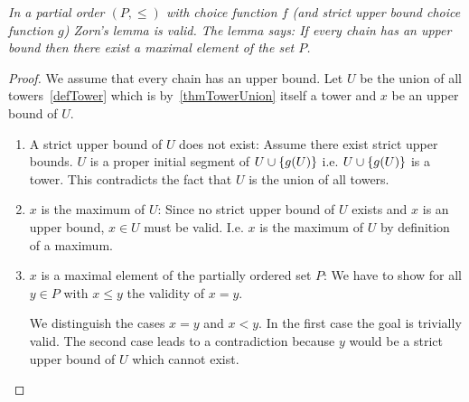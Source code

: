 \begin{theorem}
    \label{thmZornLemma}
    \emph{In a partial order $(P, \le)$ with choice function $f$ (and strict
    upper bound choice function $g$) Zorn's lemma is valid. The lemma says:
    If every chain has an upper bound then there exist a maximal element
    of the set $P$.}


    \begin{proof}
        We assume that every chain has an upper bound. Let $U$ be the union of
        all towers~\ref{defTower} which is by~\ref{thmTowerUnion} itself a tower
        and $x$ be an upper bound of $U$.

        \begin{enumerate}
            \item A strict upper bound of $U$ does not exist: Assume there exist
                strict upper bounds. $U$ is a proper initial segment of $U \cup
                \left\{g(U)\right\}$ i.e. $U \cup \left\{g(U)\right\}$ is a tower. This contradicts
                the fact that $U$ is the union of all towers.

            \item $x$ is the maximum of $U$: Since no strict upper bound of $U$
                exists and $x$ is an upper bound, $x \in U$ must be valid. I.e.
                $x$ is the maximum of $U$ by definition of a maximum.

            \item $x$ is a maximal element of the partially ordered set $P$: We
                have to show for all $y \in P$ with $x \le y$ the validity of $x
                = y$.

                We distinguish the cases $x = y$ and $x < y$. In the first case
                the goal is trivially valid. The second case leads to a
                contradiction because $y$ would be  a strict upper bound of $U$
                which cannot exist.
        \end{enumerate}
    \end{proof}
\end{theorem}
